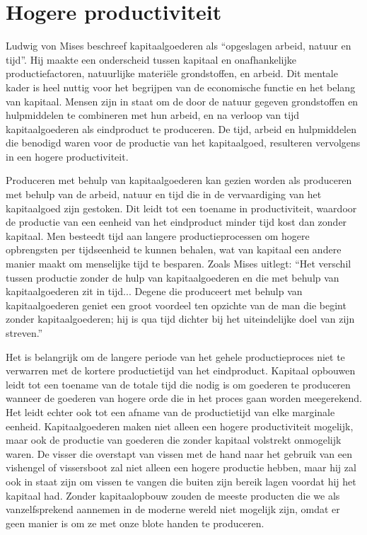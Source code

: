 \hypertarget{hogere-productiviteit}{%
\section{Hogere productiviteit}\label{hogere-productiviteit}}

Ludwig von Mises beschreef kapitaalgoederen als ``opgeslagen arbeid, natuur en tijd''.\autocite{61} Hij maakte een onderscheid tussen kapitaal en onafhankelijke productiefactoren, natuurlijke materiële grondstoffen, en arbeid. Dit mentale kader is heel nuttig voor het begrijpen van de economische functie en het belang van kapitaal. Mensen zijn in staat om de door de natuur gegeven grondstoffen en hulpmiddelen te combineren met hun arbeid, en na verloop van tijd kapitaalgoederen als eindproduct te produceren. De tijd, arbeid en hulpmiddelen die benodigd waren voor de productie van het kapitaalgoed, resulteren vervolgens in een hogere productiviteit.

Produceren met behulp van kapitaalgoederen kan gezien worden als produceren met behulp van de arbeid, natuur en tijd die in de vervaardiging van het kapitaalgoed zijn gestoken. Dit leidt tot een toename in productiviteit, waardoor de productie van een eenheid van het eindproduct minder tijd kost dan zonder kapitaal. Men besteedt tijd aan langere productieprocessen om hogere opbrengsten per tijdseenheid te kunnen behalen, wat van kapitaal een andere manier maakt om menselijke tijd te besparen. Zoals Mises uitlegt: ``Het verschil tussen productie zonder de hulp van kapitaalgoederen en die met behulp van kapitaalgoederen zit in tijd... Degene die produceert met behulp van kapitaalgoederen geniet een groot voordeel ten opzichte van de man die begint zonder kapitaalgoederen; hij is qua tijd dichter bij het uiteindelijke doel van zijn streven.'' \autocite{62}

Het is belangrijk om de langere periode van het gehele productieproces niet te verwarren met de kortere productietijd van het eindproduct. Kapitaal opbouwen leidt tot een toename van de totale tijd die nodig is om goederen te produceren wanneer de goederen van hogere orde die in het proces gaan worden meegerekend. Het leidt echter ook tot een afname van de productietijd van elke marginale eenheid. Kapitaalgoederen maken niet alleen een hogere productiviteit mogelijk, maar ook de productie van goederen die zonder kapitaal volstrekt onmogelijk waren. De visser die overstapt van vissen met de hand naar het gebruik van een vishengel of vissersboot zal niet alleen een hogere productie hebben, maar hij zal ook in staat zijn om vissen te vangen die buiten zijn bereik lagen voordat hij het kapitaal had. Zonder kapitaalopbouw zouden de meeste producten die we als vanzelfsprekend aannemen in de moderne wereld niet mogelijk zijn, omdat er geen manier is om ze met onze blote handen te produceren.

